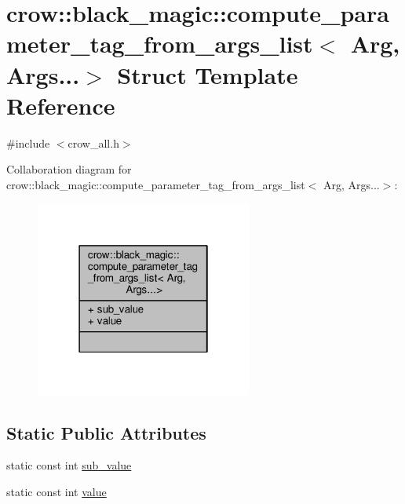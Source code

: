\hypertarget{structcrow_1_1black__magic_1_1compute__parameter__tag__from__args__list_3_01_arg_00_01_args_8_8_8_4}{\section{crow\-:\-:black\-\_\-magic\-:\-:compute\-\_\-parameter\-\_\-tag\-\_\-from\-\_\-args\-\_\-list$<$ Arg, Args...$>$ Struct Template Reference}
\label{structcrow_1_1black__magic_1_1compute__parameter__tag__from__args__list_3_01_arg_00_01_args_8_8_8_4}
}


{\ttfamily \#include $<$crow\-\_\-all.\-h$>$}



Collaboration diagram for crow\-:\-:black\-\_\-magic\-:\-:compute\-\_\-parameter\-\_\-tag\-\_\-from\-\_\-args\-\_\-list$<$ Arg, Args...$>$\-:
\nopagebreak
\begin{figure}[H]
\begin{center}
\leavevmode
\includegraphics[width=202pt]{structcrow_1_1black__magic_1_1compute__parameter__tag__from__args__list_3_01_arg_00_01_args_8_8_8_4__coll__graph}
\end{center}
\end{figure}
\subsection*{Static Public Attributes}
\begin{DoxyCompactItemize}
\item 
static const int \hyperlink{structcrow_1_1black__magic_1_1compute__parameter__tag__from__args__list_3_01_arg_00_01_args_8_8_8_4_a4bbefabf41046c28166fcbff53fa4a09}{sub\-\_\-value}
\item 
static const int \hyperlink{structcrow_1_1black__magic_1_1compute__parameter__tag__from__args__list_3_01_arg_00_01_args_8_8_8_4_a14aa3a0f1dc86b1e62539ffcec6701af}{value}
\end{DoxyCompactItemize}


